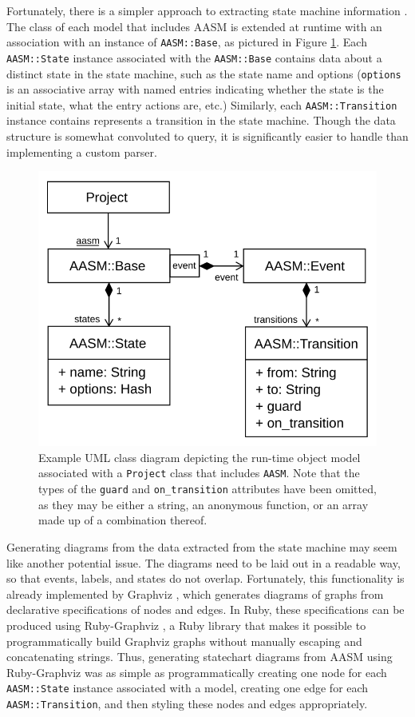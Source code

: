 \documentclass[document.tex]{subfiles}
\begin{document}
Fortunately, there is a simpler approach to extracting state machine information . The class of each model that includes AASM is extended at runtime with an association with an instance of \verb!AASM::Base!, as pictured in Figure \ref{fig:aasm-class-model}. Each \verb!AASM::State! instance associated with the \verb!AASM::Base! contains data about a distinct state in the state machine, such as the state name and options (\verb!options! is an associative array with named entries indicating whether the state is the initial state, what the entry actions are, etc.) Similarly, each \verb!AASM::Transition! instance contains represents a transition in the state machine. Though the data structure is somewhat convoluted to query, it is significantly easier to handle than implementing a custom parser.

\begin{figure}[!htbp]
  \centering
  \includegraphics{./img/case-study-fourth-year-system/aasm-class-model}
  \cprotect
  \caption{Example UML class diagram depicting the run-time object model associated with a \verb!Project! class that includes \verb!AASM!. Note that the types of the \verb!guard! and \verb!on_transition! attributes have been omitted, as they may be either a string, an anonymous function, or an array made up of a combination thereof.}
  \label{fig:aasm-class-model}
\end{figure}

Generating diagrams from the data extracted from the state machine may seem like another potential issue. The diagrams need to be laid out in a readable way, so that events, labels, and states do not overlap. Fortunately, this functionality is already implemented by Graphviz \cite{graphviz}, which generates diagrams of graphs from declarative specifications of nodes and edges.
In Ruby, these specifications can be produced using Ruby-Graphviz \cite{ruby-graphviz}, a Ruby library that makes it possible to programmatically build Graphviz graphs without manually escaping and concatenating strings. Thus, generating statechart diagrams from AASM using Ruby-Graphviz was as simple as programmatically creating one node for each \verb!AASM::State! instance associated with a model, creating one edge for each \verb!AASM::Transition!, and then styling these nodes and edges appropriately.
\end{document}
